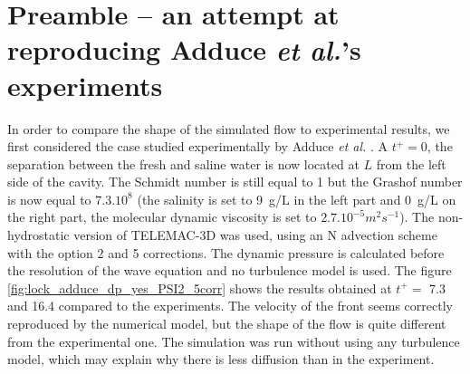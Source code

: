 \section{Preamble -- an attempt at reproducing Adduce \textit{et al.}'s experiments}\label{sec:adduce}

In order to compare the shape of the simulated flow to experimental results,
we first considered the case studied experimentally by Adduce \textit{et al.} \cite{Adduce2012}.
A $t^+=0$, the separation between the fresh and saline water is now located at
$L$ from the left side of the cavity.
The Schmidt number is still equal to 1 but the Grashof number is now
equal to $7.3.10^{8}$ (the salinity is set to 9~g/L in the left part and 0~g/L on the right part,
the molecular dynamic viscosity is set to $2.7.10^{-5}m^2s^{-1}$).
The non-hydrostatic version of TELEMAC-3D was used, using an N
advection scheme with the option 2 and 5 corrections.
The dynamic pressure is calculated before the resolution of the
wave equation and no turbulence model is used.
The figure \ref{fig:lock_adduce_dp_yes_PSI2_5corr} shows the
results obtained at $t^+=$ 7.3 and 16.4 compared to the experiments.
The velocity of the front seems correctly reproduced by the numerical model,
but the shape of the flow is quite different from the experimental one.
The simulation was run without using any turbulence model,
which may explain why there is less diffusion than in the experiment.
